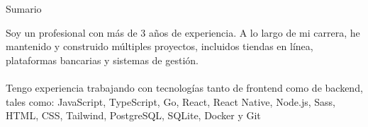 \documentclass[]{mcdowell-cv/mcdowellcv}
\begin{document}
    \makeheader

    \begin{cvsection}{Sumario}
        \begin{cvsubsection}{}{}{}
            Soy un profesional con más de 3 años de experiencia.
            A lo largo de mi carrera, he mantenido y construido múltiples proyectos, incluidos tiendas en línea, plataformas bancarias y sistemas de gestión.\\\\
            Tengo experiencia trabajando con tecnologías tanto de frontend como de backend, tales como: JavaScript, TypeScript, Go, React, React Native, Node.js, Sass, HTML, CSS, Tailwind, PostgreSQL, SQLite, Docker y Git
        \end{cvsubsection}
    \end{cvsection}
\end{document}
